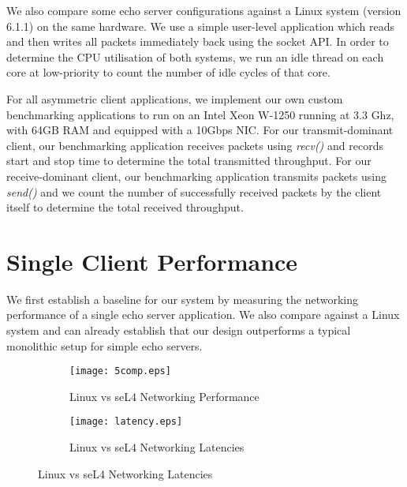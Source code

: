 We also compare some echo server configurations against a Linux system (version 6.1.1) on the same hardware. 
We use a simple user-level application which reads and then writes all packets immediately back using the socket API. 
In order to determine the CPU utilisation of both systems, we run an idle thread on each core
at low-priority to count the number of idle cycles of that core. 

For all asymmetric client applications, we implement our own custom benchmarking applications to run on an Intel Xeon W-1250
running at 3.3 Ghz, with 64GB RAM and equipped with a 10Gbps NIC. For our transmit-dominant client, our benchmarking
application receives packets using \emph{recv()} and records start and stop time to determine the total transmitted
throughput. For our receive-dominant client, our benchmarking application transmits packets using \emph{send()} and
we count the number of successfully received packets by the client itself to determine the total received throughput.

\section{Single Client Performance}

We first establish a baseline for our system by measuring the networking performance of a single echo server application. 
We also compare against a Linux system and can already establish that our design outperforms a typical monolithic setup 
for simple echo servers. 

\noindent\begin{figure}[H]
    \centering
	\begin{multicols}{2}
		\begin{subfigure}[b]{0.45\textwidth}
        \centering
        \texttt{[image: 5comp.eps]}
        \caption{Linux vs seL4 Networking Performance}
        \label{f:perf}
    \end{subfigure}\qquad
    \begin{subfigure}[b]{0.45\textwidth}
        \centering
        \vspace{0.15cm}
        \texttt{[image: latency.eps]}
        \caption{Linux vs seL4 Networking Latencies}
        \label{f:perf_latencies}
    \end{subfigure}
\end{multicols}
\end{figure}

